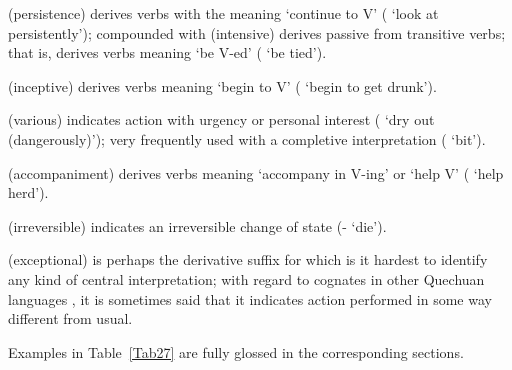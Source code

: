  (persistence) derives verbs with the meaning `continue to V' ( `look at persistently'); compounded with  (intensive)  derives passive from transitive verbs; that is,  derives verbs meaning `be V-ed' ( `be tied').

 (inceptive) derives verbs meaning `begin to V' ( `begin to get drunk').

 (various) indicates action with urgency or personal interest ( `dry out (dangerously)'); very frequently used with a completive interpretation ( `bit').

 (accompaniment) derives verbs meaning `accompany in V-ing' or `help V' ( `help herd').

 (irreversible) indicates an irreversible change of state (- `die').

 (exceptional) is perhaps the derivative suffix for which is it hardest to identify any kind of central interpretation; with regard to cognates in other Quechuan languages , it is sometimes said that it indicates action performed in some way different from usual. 

Examples in Table~\ref{Tab27} are fully glossed in the corresponding sections.

